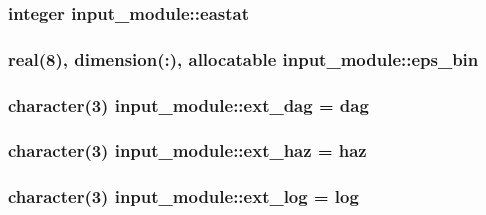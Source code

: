 \subsubsection[{eastat}]{\setlength{\rightskip}{0pt plus 5cm}integer input\+\_\+module\+::eastat}\label{namespaceinput__module_ada333752feb1551085c3d0331da41a6d}
\hypertarget{namespaceinput__module_a6900d0ebf1a2f906895db37f5b82e495}{}
\subsubsection[{eps\+\_\+bin}]{\setlength{\rightskip}{0pt plus 5cm}real(8), dimension(\+:), allocatable input\+\_\+module\+::eps\+\_\+bin}\label{namespaceinput__module_a6900d0ebf1a2f906895db37f5b82e495}
\hypertarget{namespaceinput__module_ab8a4b6a5af6ac707c4c8656e4d709bec}{}
\subsubsection[{ext\+\_\+dag}]{\setlength{\rightskip}{0pt plus 5cm}character(3) input\+\_\+module\+::ext\+\_\+dag = \textquotesingle{}dag\textquotesingle{}}\label{namespaceinput__module_ab8a4b6a5af6ac707c4c8656e4d709bec}
\hypertarget{namespaceinput__module_a860f66b4ca95c52a45651e1a7033e302}{}
\subsubsection[{ext\+\_\+haz}]{\setlength{\rightskip}{0pt plus 5cm}character(3) input\+\_\+module\+::ext\+\_\+haz = \textquotesingle{}haz\textquotesingle{}}\label{namespaceinput__module_a860f66b4ca95c52a45651e1a7033e302}
\hypertarget{namespaceinput__module_a781c43885db3614608686197e48ab56b}{}
\subsubsection[{ext\+\_\+log}]{\setlength{\rightskip}{0pt plus 5cm}character(3) input\+\_\+module\+::ext\+\_\+log = \textquotesingle{}log\textquotesingle{}}\label{namespaceinput__module_a781c43885db3614608686197e48ab56b}
\hypertarget{namespaceinput__module_a5ba0c6f56b537efe7105ffc5ef3a9a98}{}
